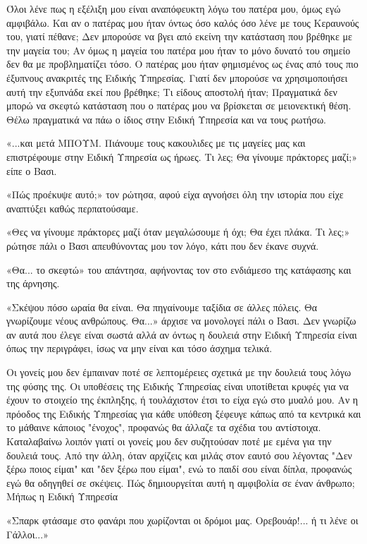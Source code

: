 \documentclass[12pt,twoside, openany]{book}
\begin{document}
Όλοι λένε πως η εξέλιξη μου είναι αναπόφευκτη λόγω του πατέρα μου, όμως εγώ αμφιβάλω. Και αν ο πατέρας μου ήταν όντως όσο καλός όσο λένε με τους Κεραυνούς του, γιατί πέθανε; Δεν μπορούσε να βγει από εκείνη την κατάσταση που βρέθηκε με την μαγεία του; Αν όμως η μαγεία του πατέρα μου ήταν το μόνο δυνατό του σημείο δεν θα με προβληματίζει τόσο. Ο πατέρας μου ήταν φημισμένος ως ένας από τους πιο έξυπνους ανακριτές της Ειδικής Υπηρεσίας. Γιατί δεν μπορούσε να χρησιμοποιήσει αυτή την εξυπνάδα εκεί που βρέθηκε; Τι είδους αποστολή ήταν; Πραγματικά δεν μπορώ να σκεφτώ κατάσταση που ο πατέρας μου να βρίσκεται σε μειονεκτική θέση. Θέλω πραγματικά να πάω ο ίδιος στην Ειδική Υπηρεσία και να τους ρωτήσω.

«...και μετά ΜΠΟΥΜ. Πιάνουμε τους κακουλιδες με τις μαγείες μας και επιστρέφουμε στην Ειδική Υπηρεσία ως ήρωες. Τι λες; Θα γίνουμε πράκτορες μαζί;» είπε ο Βασι.

«Πώς προέκυψε αυτό;» τον ρώτησα, αφού είχα αγνοήσει όλη την ιστορία που είχε αναπτύξει καθώς περπατούσαμε.

«Θες να γίνουμε πράκτορες μαζί όταν μεγαλώσουμε ή όχι; Θα έχει πλάκα. Τι λες;» ρώτησε πάλι ο Βασι απευθύνοντας μου τον λόγο, κάτι που δεν έκανε συχνά.

«Θα... το σκεφτώ» του απάντησα, αφήνοντας τον στο ενδιάμεσο της κατάφασης και της άρνησης.

«Σκέψου πόσο ωραία θα είναι. Θα πηγαίνουμε ταξίδια σε άλλες πόλεις. Θα γνωρίζουμε νέους ανθρώπους. Θα...» άρχισε να μονολογεί πάλι ο Βασι. Δεν γνωρίζω αν αυτά που έλεγε είναι σωστά αλλά αν όντως η δουλειά στην Ειδική Υπηρεσία είναι όπως την περιγράφει, ίσως να μην είναι και τόσο άσχημα τελικά. 

Οι γονείς μου δεν έμπαιναν ποτέ σε λεπτομέρειες σχετικά με την δουλειά τους λόγω της φύσης της. Οι υποθέσεις της Ειδικής Υπηρεσίας είναι υποτίθεται κρυφές για να έχουν το στοιχείο της έκπληξης, ή τουλάχιστον έτσι το είχα εγώ στο μυαλό μου. Αν η πρόοδος της Ειδικής Υπηρεσίας για κάθε υπόθεση ξέφευγε κάπως από τα κεντρικά και το μάθαινε κάποιος "ένοχος", προφανώς θα άλλαζε τα σχέδια του αντίστοιχα. Καταλαβαίνω λοιπόν γιατί οι γονείς μου δεν συζητούσαν ποτέ με εμένα για την δουλειά τους. Από την άλλη, όταν αρχίζεις και μιλάς στον εαυτό σου λέγοντας "Δεν ξέρω ποιος είμαι" και "δεν ξέρω που είμαι", ενώ το παιδί σου είναι δίπλα, προφανώς εγώ θα οδηγηθεί σε σκέψεις. Πώς δημιουργείται αυτή η αμφιβολία σε έναν άνθρωπο; Μήπως η Ειδική Υπηρεσία 

«Σπαρκ φτάσαμε στο φανάρι που χωρίζονται οι δρόμοι μας. Ορεβουάρ!... ή τι λένε οι Γάλλοι...»
\end{document}
